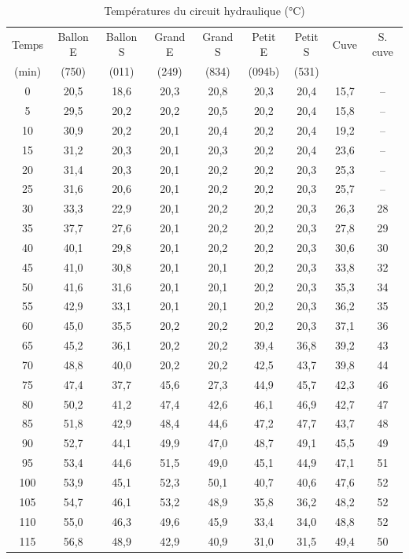 \begin{table}[htbp]
  \centering
  \footnotesize
  \setlength{\tabcolsep}{3pt}
  \caption{Températures du circuit hydraulique (°C)}
  \label{tab:valeurs-temperatures}
  \begin{tabular}{ccccccccc}
    \hline
    Temps & Ballon E & Ballon S & Grand E & Grand S & Petit E & Petit S & Cuve & S. cuve \\
    (min) & (750) & (011) & (249) & (834) & (094b) & (531) & & \\
    \hline
    0 & 20,5 & 18,6 & 20,3 & 20,8 & 20,3 & 20,4 & 15,7 & -- \\
    5 & 29,5 & 20,2 & 20,2 & 20,5 & 20,2 & 20,4 & 15,8 & -- \\
    10 & 30,9 & 20,2 & 20,1 & 20,4 & 20,2 & 20,4 & 19,2 & -- \\
    15 & 31,2 & 20,3 & 20,1 & 20,3 & 20,2 & 20,4 & 23,6 & -- \\
    20 & 31,4 & 20,3 & 20,1 & 20,2 & 20,2 & 20,3 & 25,3 & -- \\
    25 & 31,6 & 20,6 & 20,1 & 20,2 & 20,2 & 20,3 & 25,7 & -- \\
    30 & 33,3 & 22,9 & 20,1 & 20,2 & 20,2 & 20,3 & 26,3 & 28 \\
    35 & 37,7 & 27,6 & 20,1 & 20,2 & 20,2 & 20,3 & 27,8 & 29 \\
    40 & 40,1 & 29,8 & 20,1 & 20,2 & 20,2 & 20,3 & 30,6 & 30 \\
    45 & 41,0 & 30,8 & 20,1 & 20,1 & 20,2 & 20,3 & 33,8 & 32 \\
    50 & 41,6 & 31,6 & 20,1 & 20,1 & 20,2 & 20,3 & 35,3 & 34 \\
    55 & 42,9 & 33,1 & 20,1 & 20,1 & 20,2 & 20,3 & 36,2 & 35 \\
    60 & 45,0 & 35,5 & 20,2 & 20,2 & 20,2 & 20,3 & 37,1 & 36 \\
    65 & 45,2 & 36,1 & 20,2 & 20,2 & 39,4 & 36,8 & 39,2 & 43 \\
    70 & 48,8 & 40,0 & 20,2 & 20,2 & 42,5 & 43,7 & 39,8 & 44 \\
    75 & 47,4 & 37,7 & 45,6 & 27,3 & 44,9 & 45,7 & 42,3 & 46 \\
    80 & 50,2 & 41,2 & 47,4 & 42,6 & 46,1 & 46,9 & 42,7 & 47 \\
    85 & 51,8 & 42,9 & 48,4 & 44,6 & 47,2 & 47,7 & 43,7 & 48 \\
    90 & 52,7 & 44,1 & 49,9 & 47,0 & 48,7 & 49,1 & 45,5 & 49 \\
    95 & 53,4 & 44,6 & 51,5 & 49,0 & 45,1 & 44,9 & 47,1 & 51 \\
    100 & 53,9 & 45,1 & 52,3 & 50,1 & 40,7 & 40,6 & 47,6 & 52 \\
    105 & 54,7 & 46,1 & 53,2 & 48,9 & 35,8 & 36,2 & 48,2 & 52 \\
    110 & 55,0 & 46,3 & 49,6 & 45,9 & 33,4 & 34,0 & 48,8 & 52 \\
    115 & 56,8 & 48,9 & 42,9 & 40,9 & 31,0 & 31,5 & 49,4 & 50 \\
    \hline
  \end{tabular}
\end{table}

